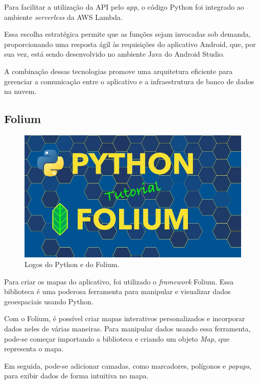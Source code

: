     Para facilitar a utilização da API pelo \textit{app}, o código Python foi integrado ao ambiente \textit{serverless} da AWS Lambda. 
    
    Essa escolha estratégica permite que as funções sejam invocadas sob demanda, proporcionando uma resposta ágil às requisições do aplicativo Android, que, por sua vez, está sendo desenvolvido no ambiente Java do Android Studio. 
    
    A combinação dessas tecnologias promove uma arquitetura eficiente para gerenciar a comunicação entre o aplicativo e a infraestrutura de banco de dados na nuvem.

    \subsection{Folium}

\begin{figure}[hp]
    \centering
    
    \includegraphics[scale=0.1]{figures/python_folium.jpg}
    
    \caption{Logos do Python e do Folium.}
\end{figure}

 Para criar os mapas do aplicativo, foi utilizado o \textit{framework} Folium. Essa biblioteca é uma poderosa ferramenta para manipular e visualizar dados geoespaciais usando Python. 
    
    Com o Folium, é possível criar mapas interativos personalizados e incorporar dados neles de várias maneiras. Para manipular dados usando essa ferramenta, pode-se começar importando a biblioteca e criando um objeto \textit{Map}, que representa o mapa. 
    
    Em seguida, pode-se adicionar camadas, como marcadores, polígonos e \textit{popups}, para exibir dados de forma intuitiva no mapa. 
    
